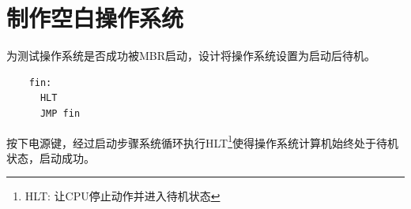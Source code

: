 \inputminted[tabsize=2, firstline=43, lastline=45,
linenos=true]{nasm}{../ZOS/src/kernel/ipl09.nas}

\inputminted[tabsize=2, firstline=76, lastline=88,
linenos=true]{nasm}{../ZOS/src/kernel/ipl09.nas}

\begin{listing}[H]
  \inputminted[tabsize=2, firstline=125, lastline=147,
  linenos=true]{nasm}{../ZOS/src/kernel/ipl09.nas}
\end{listing}

\section{制作空白操作系统}

为测试操作系统是否成功被MBR启动，设计将操作系统设置为启动后待机。

\begin{verbatim}
    fin:
      HLT
      JMP fin
\end{verbatim}

按下电源键，经过启动步骤系统循环执行HLT\footnote{HLT: 让CPU停止动作并进入待机状态}使得操作系统计算机始终处于待机状态，启动成功。


